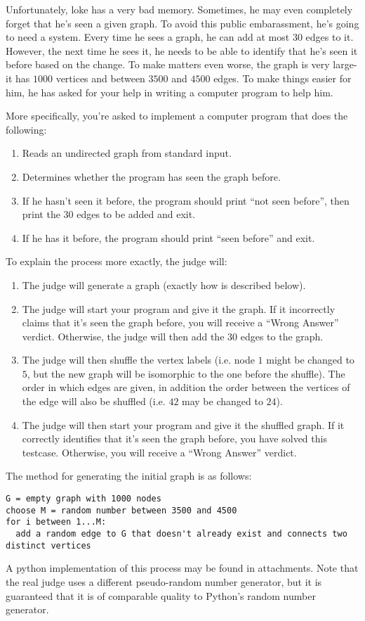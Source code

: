 \noindent
Unfortunately, loke has a very bad memory. Sometimes, he may even completely forget that he's seen a given graph. 
To avoid this public embarassment, he's going to need a system. Every time he sees a graph, he can add at most $30$
edges to it. However, the next time he sees it, he needs to be able to identify that he's seen it before based on the
change. To make matters even worse, the graph is very large- it has $1000$ vertices and between $3500$ and $4500$ edges.
To make things easier for him, he has asked for your help in writing a computer program to help him.

More specifically, you're asked to implement a computer program that does the following:
\begin{enumerate}
  \item Reads an undirected graph from standard input.
  \item Determines whether the program has seen the graph before.
  \item If he hasn't seen it before, the program should print ``not seen before'', then print the $30$ edges to be added and exit.
  \item If he has it before, the program should print ``seen before'' and exit.
\end{enumerate}
To explain the process more exactly, the judge will:
\begin{enumerate}
  \item The judge will generate a graph (exactly how is described below).
  \item The judge will start your program and give it the graph. If it incorrectly claims that it's seen the graph before,
  you will receive a ``Wrong Answer'' verdict. Otherwise, the judge will then add the $30$ edges to the graph.
  \item The judge will then shuffle the vertex labels (i.e. node $1$ might be changed to $5$, but the new
  graph will be isomorphic to the one before the shuffle). The order in which edges are given, in addition the
  order between the vertices of the edge will also be shuffled (i.e. $4 2$ may be changed to $2 4$).
  \item The judge will then start your program and give it the shuffled graph. If it correctly identifies that
  it's seen the graph before, you have solved this testcase. Otherwise, you will receive a ``Wrong Answer'' verdict.
\end{enumerate}

The method for generating the initial graph is as follows:
\begin{verbatim}
G = empty graph with 1000 nodes
choose M = random number between 3500 and 4500
for i between 1...M:
  add a random edge to G that doesn't already exist and connects two distinct vertices
\end{verbatim}
A python implementation of this process may be found in attachments. Note that the real judge uses a different pseudo-random
number generator, but it is guaranteed that it is of comparable quality to Python's random number generator.


